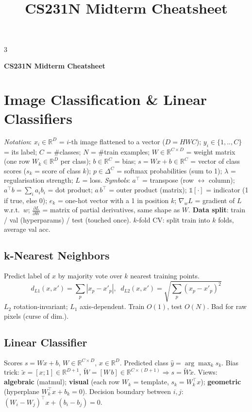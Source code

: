 \documentclass[a4paper,9pt,landscape]{scrartcl}
\title{\vspace{-2.5em}CS231N Midterm Cheatsheet}
\author{}\date{}
\newcommand{\R}{\mathbb{R}}
\newcommand{\dd}[2]{\frac{\partial #1}{\partial #2}}
\begin{document}
\begin{multicols*}{3}
{\centering\large\textbf{CS231N Midterm Cheatsheet}\par\vspace{2pt}}
\scriptsize
\setlength{\abovedisplayskip}{1pt}
\setlength{\belowdisplayskip}{1pt}
\setlength{\abovedisplayshortskip}{0pt}
\setlength{\belowdisplayshortskip}{0pt}
\setlength{\jot}{1pt}

\section{Image Classification \& Linear Classifiers}
\textit{Notation}: $x_i\!\in\!\R^D$ = $i$-th image flattened to a vector ($D{=}HWC$); $y_i\!\in\!\{1,..,C\}$ = its label; $C$ = \#classes; $N$ = \#train examples; $W\!\in\!\R^{C\times D}$ = weight matrix (one row $W_k\!\in\!\R^D$ per class); $b\!\in\!\R^C$ = bias; $s=Wx+b\!\in\!\R^C$ = vector of class scores ($s_k$ = score of class $k$); $p\!\in\!\Delta^C$ = softmax probabilities (sum to 1); $\lambda$ = regularisation strength; $L$ = loss.
\textit{Symbols}: $a^\top$ = transpose (row $\leftrightarrow$ column); $a^\top b{=}\sum_i a_i b_i$ = dot product; $a\,b^\top$ = outer product (matrix); $\mathbb{1}[\cdot]$ = indicator (1 if true, else 0); $e_k$ = one-hot vector with a 1 in position $k$; $\nabla_w L$ = gradient of $L$ w.r.t.\ $w$; $\dd{L}{W}$ = matrix of partial derivatives, same shape as $W$.
\textbf{Data split}: train / val (hyperparams) / test (touched once). $k$-fold CV: split train into $k$ folds, average val acc.

\subsection{k-Nearest Neighbors}
Predict label of $x$ by majority vote over $k$ nearest training points.
$$d_{L1}(x,x')=\sum_p|x_p-x'_p|,\;\; d_{L2}(x,x')=\sqrt{\sum_p(x_p-x'_p)^2}$$
$L_2$ rotation-invariant; $L_1$ axis-dependent. Train $O(1)$, test $O(N)$. Bad for raw pixels (curse of dim.).

\subsection{Linear Classifier}
Scores $s=Wx+b$, $W\!\in\!\R^{C\times D}$, $x\!\in\!\R^D$. Predicted class $\hat y=\arg\max_k s_k$. Bias trick: $\tilde x=[x;1]\!\in\!\R^{D+1}$, $\tilde W=[W\,b]\!\in\!\R^{C\times(D+1)}\Rightarrow s=\tilde W\tilde x$.
Views: \textbf{algebraic} (matmul); \textbf{visual} (each row $W_k$ = template, $s_k=W_k^\top x$); \textbf{geometric} (hyperplane $W_k^\top x{+}b_k{=}0$). Decision boundary between $i,j$: $(W_i{-}W_j)^\top x+(b_i{-}b_j)=0$.


\end{multicols*}
\end{document}
